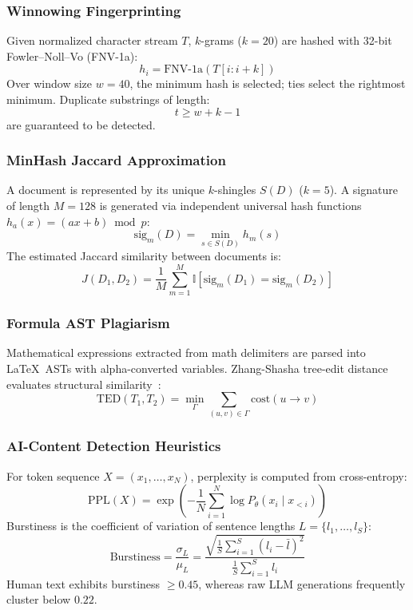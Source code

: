 \documentclass[conference]{IEEEtran}
\begin{document}
\subsubsection{Winnowing Fingerprinting}
Given normalized character stream $T$, $k$-grams ($k=20$) are hashed with 32-bit Fowler--Noll--Vo (FNV-1a):
\begin{equation}
h_i = \mathrm{FNV\text{-}1a}(T[i : i+k])
\label{eq:fnv}
\end{equation}
Over window size $w=40$, the minimum hash is selected; ties select the rightmost minimum. Duplicate substrings of length:
\begin{equation}
t \ge w + k - 1
\label{eq:guarantee}
\end{equation}
are guaranteed to be detected.

\subsubsection{MinHash Jaccard Approximation}
A document is represented by its unique $k$-shingles $S(D)$ ($k=5$). A signature of length $M=128$ is generated via independent universal hash functions $h_a(x) = (ax + b) \bmod p$:
\begin{equation}
\mathrm{sig}_m(D) = \min_{s \in S(D)} h_m(s)
\label{eq:sig}
\end{equation}
The estimated Jaccard similarity between documents is:
\begin{equation}
\hat{J}(D_1, D_2) = \frac{1}{M} \sum_{m=1}^M \mathbb{I}[\mathrm{sig}_m(D_1) = \mathrm{sig}_m(D_2)]
\label{eq:jaccard}
\end{equation}

\subsubsection{Formula AST Plagiarism}
Mathematical expressions extracted from math delimiters are parsed into \LaTeX\ ASTs with alpha-converted variables. Zhang-Shasha tree-edit distance evaluates structural similarity~\cite{zhang1989tree}:
\begin{equation}
\mathrm{TED}(T_1, T_2) = \min_{\Gamma} \sum_{(u,v) \in \Gamma} \mathrm{cost}(u \to v)
\label{eq:ted}
\end{equation}

\subsubsection{AI-Content Detection Heuristics}
For token sequence $X = (x_1, \ldots, x_N)$, perplexity is computed from cross-entropy:
\begin{equation}
\mathrm{PPL}(X) = \exp\left( -\frac{1}{N} \sum_{i=1}^N \log P_\theta(x_i \mid x_{<i}) \right)
\label{eq:ppl}
\end{equation}
Burstiness is the coefficient of variation of sentence lengths $L = \{l_1, \ldots, l_S\}$:
\begin{equation}
\mathrm{Burstiness} = \frac{\sigma_L}{\mu_L} = \frac{\sqrt{\frac{1}{S}\sum_{i=1}^S (l_i - \bar{l})^2}}{\frac{1}{S}\sum_{i=1}^S l_i}
\label{eq:burstiness}
\end{equation}
Human text exhibits burstiness $\ge 0.45$, whereas raw LLM generations frequently cluster below $0.22$.
\end{document}
